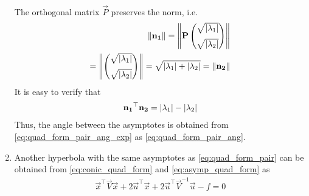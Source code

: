 \documentclass[journal,12pt,twocolumn]{IEEEtran}
\renewcommand\thesection{\arabic{section}}
\renewcommand\thesubsection{\thesection.\arabic{subsection}}
\begin{document}
\begin{enumerate}[label=\thesubsection.\arabic*.,ref=\thesubsection.\theenumi]
\begin{align}
\end{align} 
The orthogonal matrix $\vec{P}$ preserves the norm, i.e.
\begin{align} 
\left\lVert\mathbf{n_1}\right\rVert = \left\lVert\mathbf{P}\begin{pmatrix}\sqrt{\left\vert\lambda_1\right\vert} \\[2mm]  \sqrt{\left\vert\lambda_2\right\vert}\end{pmatrix}\right\rVert
\\
=\left\lVert\begin{pmatrix}\sqrt{\left\vert\lambda_1\right\vert} \\[2mm]  \sqrt{\left\vert\lambda_2\right\vert}\end{pmatrix}\right\rVert
=\sqrt{\left\vert\lambda_1\right\vert+\left\vert\lambda_2\right\vert} = \left\lVert\mathbf{n_2}\right\rVert
\end{align} 
It is easy to verify that 
\begin{align} 
\mathbf{n_1}^{\top}\mathbf{n_2} = \left\vert\lambda_1\right\vert-\left\vert\lambda_2\right\vert
\end{align} 
%
Thus, the angle between the asymptotes is obtained from \eqref{eq:quad_form_pair_ang_exp} as \eqref{eq:quad_form_pair_ang}.
\item Another hyperbola with the same asymptotes as \eqref{eq:quad_form_pair} can be obtained from \eqref{eq:conic_quad_form} and \eqref{eq:asymp_quad_form} as
\begin{align}
\label{eq:hyper_conj_quad_form}
\vec{x}^{\top}\vec{V}\vec{x}+2\vec{u}^{\top}\vec{x}+2\vec{u}^{\top}\vec{V}^{-1}\vec{u}-f=0
\end{align}
\end{enumerate}
\end{document}
